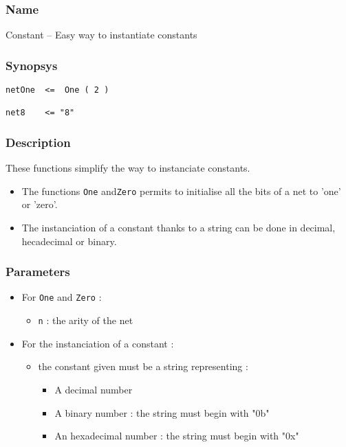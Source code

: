 \subsubsection{Name}

Constant -- Easy way to instantiate constants

\subsubsection{Synopsys}

\begin{verbatim}
netOne  <=  One ( 2 )
    
net8    <= "8"
\end{verbatim}
  
\subsubsection{Description}

These functions simplify the way to instanciate constants.
\begin{itemize}
    \item The functions \verb-One- and\verb-Zero- permits to initialise all the bits of a net to 'one' or 'zero'.
    \item The instanciation of a constant thanks to a string can be done in decimal, hecadecimal or binary.
\end{itemize}

\subsubsection{Parameters}

\begin{itemize}
    \item For \verb-One- and \verb-Zero- :
    \begin{itemize}
        \item \verb-n- : the arity of the net
    \end{itemize}
    \item For the instanciation of a constant :
    \begin{itemize}
        \item the constant given must be a string representing :
        \begin{itemize}
            \item A decimal number
            \item A binary number : the string must begin with "0b"
            \item An hexadecimal number : the string must begin with "0x"
        \end{itemize}
    \end{itemize}
\end{itemize}
          
